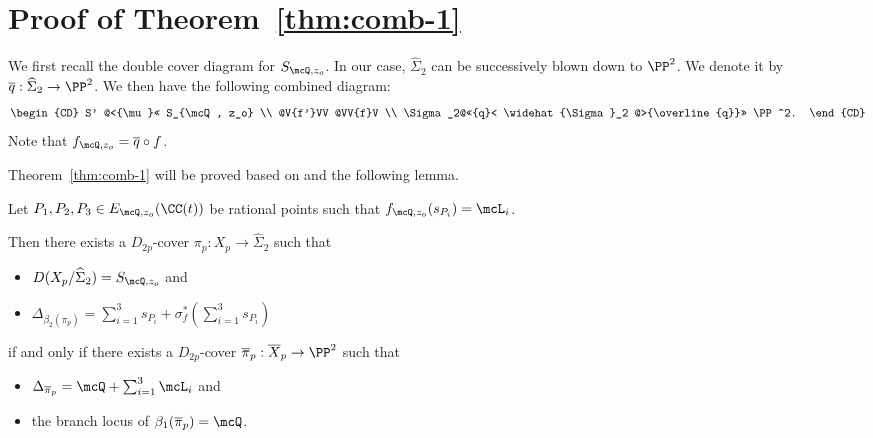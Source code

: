 
\section{Proof of Theorem~\ref{thm:comb-1}}
 
We first recall the double cover diagram for $S_{\mcQ, z_o}$. In our case,
$\widehat{\Sigma}_2$ can be successively blown down to $\PP^2$. We denote it by $\overline{q} : \widehat{\Sigma}_2 \to \PP^2$.
We then have the following combined diagram:
\[
\begin{CD}
S' @<{\mu}<< S_{\mcQ, z_o} \\
@V{f'}VV                 @VV{f}V \\
\Sigma_2@<<{q}< \widehat{\Sigma}_2 @>{\overline{q}}>>  \PP^2. 
\end{CD}
\]
Note that $f_{\mcQ, z_o} = \overline{q}\circ f$.

 Theorem~\ref{thm:comb-1} will be proved based on \cite[Theorem 3.2]{tokunaga14} and the following lemma.  




 \begin{lem}\label{lem:key-comb1}{ Let $P_1, P_2, P_3\in E_{\mcQ,z_o}(\CC(t))$ be rational points such that $f_{\mcQ, z_o}(s_{P_i})=\mcL_i$. 

 Then there exists a $D_{2p}$-cover $\pi_p : X_p \to \widehat{\Sigma}_2$ such that
 
 \begin{itemize}
 
   \item $D(X_p/\widehat{\Sigma}_2) = S_{\mcQ, z_o}$ and 
   
   \item $\Delta_{\beta_2(\pi_p)} = \sum_{i=1}^3 s_{P_i} + \sigma_f^*(\sum_{i=1}^3 s_{P_i})$ 
 \end{itemize}
 if and only if there exists a $D_{2p}$-cover $\overline{\pi}_p : \overline {X}_p \to \PP^2$ such that  
 \begin{itemize}
 
  \item $\Delta_{\overline{\pi}_p} = \mcQ + \sum_{i=1}^3 \mcL_i$ %
  and 
  \item the branch locus of $\beta_1(\overline{\pi}_p) = \mcQ$.
  \end{itemize}       
 }
 \end{lem}
 
